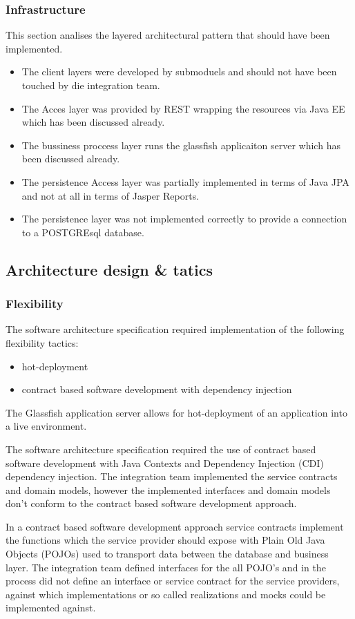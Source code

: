 \documentclass[a4paper,10pt]{article}
\begin{document}
\subsubsection{Infrastructure}
This section analises the layered architectural pattern that should have been implemented.
\begin{itemize}
	\item The client layers were developed by submoduels and should not have been touched by die integration team.
	\item The Acces layer was provided by REST wrapping the resources via Java EE which has been discussed already.
	\item The bussiness proccess layer runs the glassfish applicaiton server which has been discussed already.
	\item The persistence Access layer was partially implemented in terms of Java JPA and not at all in terms of Jasper Reports.
	\item The persistence layer was not implemented correctly to provide a connection to a POSTGREsql database.
\end{itemize}

\subsection{Architecture design \& tatics}
\subsubsection{Flexibility}
The software architecture specification required implementation of the following flexibility tactics:
\begin{itemize}
	\item hot-deployment
	\item contract based software development with dependency injection
\end{itemize}

The Glassfish application server allows for hot-deployment of an application into a live environment.

The software architecture specification required the use of contract based software development with Java Contexts and Dependency Injection (CDI) dependency injection.  The integration team implemented the service contracts and domain models, however the implemented interfaces and domain models don't conform to the contract based software development approach.

In a contract based software development approach service contracts implement the functions which the service provider should expose with Plain Old Java Objects (POJOs) used to transport data between the database and business layer.  The integration team defined interfaces for the all POJO's and in the process did not define an interface or service contract for the service providers, against which implementations or so called realizations and mocks could be implemented against.
\end{document}
